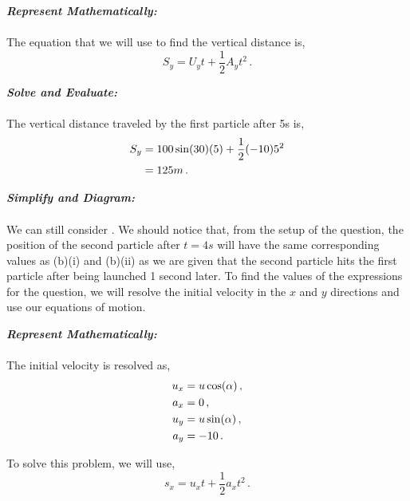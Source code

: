 \begin{subquestions}
\begin{subsubquestions}

\subsubquestion

\textbf{\textit{Represent Mathematically:}} \\ \\			
The equation that we will use to find the vertical distance is,
\begin{equation}
	S_y =U_yt + \frac{1}{2}A_yt^2 \,.	
\end{equation}




\textbf{\textit{Solve and Evaluate:}} \\ \\
The vertical distance traveled by the first particle after 5s is,
\begin{align}
	S_y & = 100\sin(30)(5) + \frac{1}{2}(-10)5^2 \nonumber \\
		& = 125m \,.
\end{align}


\subsubquestion

\textbf{\textit{Simplify and Diagram:}} \\ \\
We can still consider . We should notice that, from the setup of the question, the position of the second particle after $t=4s$ will have the same corresponding values as (b)(i) and (b)(ii) as we are given that the second particle hits the first particle after being launched 1 second later. To find the values of the expressions for the question, we will resolve the initial velocity in the $x$ and $y$ directions and use our equations of motion.




\textbf{\textit{Represent Mathematically:}} \\ \\
The initial velocity is resolved as,
\begin{align}
	u_x & = u\cos(\alpha) \,, \nonumber \\
	a_x & = 0 \,, \nonumber \\
	u_y & = u\sin(\alpha) \,, \nonumber \\
	a_y & = -10 \,.
\end{align}

To solve this problem, we will use, 
\begin{equation}
	s_x = u_xt + \frac{1}{2}a_xt^2 \,.
\end{equation}





\end{subsubquestions}
\end{subquestions}
